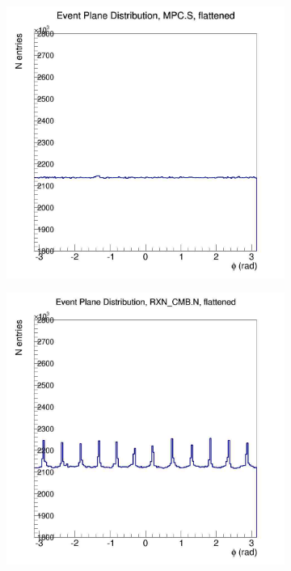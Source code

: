 \begin{figure}
\begin{subfigure}[p]{0.4\textwidth}
    \end{subfigure}
    \begin{subfigure}[p]{0.4\textwidth}
    \includegraphics[width=1\textwidth]{EPflattening/flatmpcs.jpg}
    \end{subfigure}
    \begin{subfigure}[p]{0.4\textwidth}
    \includegraphics[width=1\textwidth]{EPflattening/flatrxncmbn.jpg}

\end{subfigure}
\end{figure}
